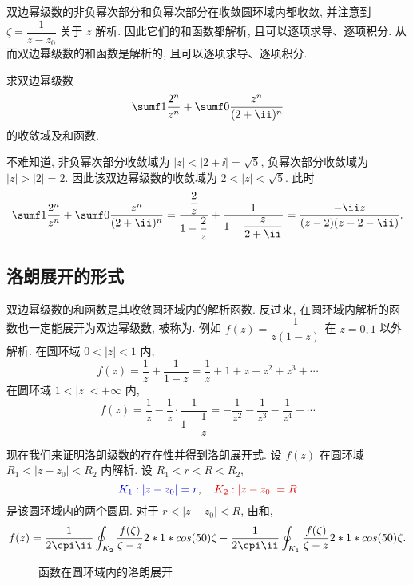 双边幂级数的非负幂次部分和负幂次部分在收敛圆环域内都收敛, 并注意到 $\zeta=\dfrac1{z-z_0}$ 关于 $z$ 解析.
因此它们的和函数都解析, 且可以逐项求导、逐项积分.
从而\alert{双边幂级数的和函数是解析的, 且可以逐项求导、逐项积分}.

\begin{example}
  求双边幂级数
  \[
    \sumf1 \frac{2^n}{z^n}+\sumf0 \frac{z^n}{(2+\ii)^n}
  \]
  的收敛域及和函数.
\end{example}

\begin{solution}
  不难知道, 非负幂次部分收敛域为 $|z|<|2+\ii|=\sqrt5$, 负幂次部分收敛域为 $|z|>|2|=2$. 
  因此该双边幂级数的收敛域为 $2<|z|<\sqrt5$.
  此时
  \[
     \sumf1 \frac{2^n}{z^n}+\sumf0 \frac{z^n}{(2+\ii)^n}
    =\frac{\dfrac2z}{1-\dfrac2z}+\frac1{1-\dfrac z{2+\ii}}
    =\frac{-\ii z}{(z-2)(z-2-\ii)}.
  \]
\end{solution}


\subsection{洛朗展开的形式}

双边幂级数的和函数是其收敛圆环域内的解析函数.
反过来, 在圆环域内解析的函数也一定能展开为双边幂级数, 被称为.
例如 $f(z)=\dfrac1{z(1-z)}$ 在 $z=0,1$ 以外解析.
在圆环域 $0<|z|<1$ 内,
\[f(z)=\frac1z+\frac1{1-z}=\frac1z+1+z+z^2+z^3+\cdots\]
在圆环域 $1<|z|<+\infty$ 内,
\[f(z)=\frac1z-\frac1z\cdot\frac1{1-\dfrac1z}=-\frac1{z^2}-\frac1{z^3}-\frac1{z^4}-\cdots\]

现在我们来证明洛朗级数的存在性并得到洛朗展开式.
设 $f(z)$ 在圆环域 $R_1<|z-z_0|<R_2$ 内解析.
设 $R_1<r<R<R_2$, 
\[
  \emphn{K_1:|z-z_0|=r},\quad \alertn{K_2:|z-z_0|=R}
\]
是该圆环域内的两个圆周.
对于 $r<|z-z_0|<R$, 由\thmCCC 和\thmCIH,
\[
   f(z)
  =\frac1{2\cpi\ii}\oint_{K_2}\frac{f(\zeta)}{\zeta-z}\d\zeta
  -\frac1{2\cpi\ii}\oint_{K_1}\frac{f(\zeta)}{\zeta-z}\d\zeta.
\]

\begin{figure}[!htb]
  \centering
  \caption{函数在圆环域内的洛朗展开}
\end{figure}


